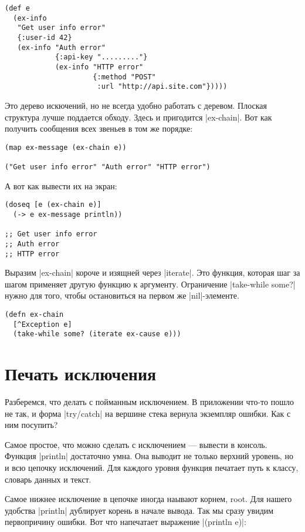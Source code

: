 \begin{verbatim}
(def e
  (ex-info
   "Get user info error"
   {:user-id 42}
   (ex-info "Auth error"
            {:api-key "........."}
            (ex-info "HTTP error"
                     {:method "POST"
                      :url "http://api.site.com"}))))
\end{verbatim}

Это дерево искючений, но не всегда удобно работать с деревом. Плоская структура
лучше поддается обходу. Здесь и пригодится \spverb|ex-chain|. Вот как получить
сообщения всех звеньев в том же порядке:

\begin{verbatim}
(map ex-message (ex-chain e))

("Get user info error" "Auth error" "HTTP error")
\end{verbatim}

А вот как вывести их на экран:

\begin{verbatim}
(doseq [e (ex-chain e)]
  (-> e ex-message println))

;; Get user info error
;; Auth error
;; HTTP error
\end{verbatim}

Выразим \spverb|ex-chain| короче и изящней через \spverb|iterate|. Это функция, которая шаг за
шагом применяет другую функцию к аргументу. Ограничение \spverb|take-while some?| нужно
для того, чтобы остановиться на первом же \spverb|nil|-элементе.

\begin{verbatim}
(defn ex-chain
  [^Exception e]
  (take-while some? (iterate ex-cause e)))
\end{verbatim}

\section{Печать исключения}

Разберемся, что делать с пойманным исключением. В приложении что-то пошло не
так, и форма \spverb|try/catch| на вершине стека вернула экземпляр ошибки. Как с ним
посупить?

Самое простое, что можно сделать с исключением — вывести в консоль. Функция
\spverb|println| достаточно умна. Она выводит не только верхний уровень, но и всю
цепочку исключений. Для каждого уровня функция печатает путь к классу, словарь
данных и текст.

Самое нижнее исключение в цепочке иногда наывают корнем, root. Для нашего
удобства \spverb|println| дублирует корень в начале вывода. Так мы сразу увидим
первопричину ошибки. Вот что напечатает выражение \spverb|(println e)|:

